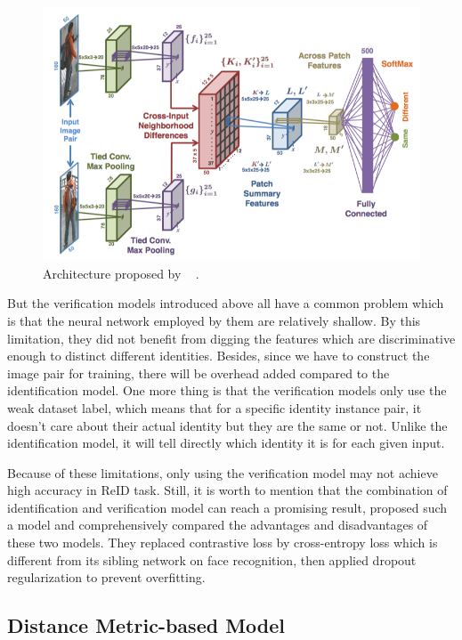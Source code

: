 \begin{figure}
    \includegraphics[width=\linewidth]{figures/cvpr15_model.png}
    \caption{Architecture proposed by ~\protect 
        \cite{an-improved-dl-archit-2015}.}
    \label{fig:cvpr15_model}
\end{figure}

But the verification models introduced above all have a common problem which is 
that the neural network employed by them are relatively
shallow. By this limitation, they did not benefit from digging the features 
which are discriminative enough to distinct different identities.
Besides, since we have to construct the image pair for training, there will be 
overhead added compared to the identification model. One more
thing is that the verification models only use the weak dataset label, which 
means that for a specific identity instance pair, it doesn't
care about their actual identity but they are the same or not. Unlike the 
identification model, it will tell directly which identity it is for each
given input.

Because of these limitations, only using the verification model may not achieve 
high accuracy in ReID task. Still, it is worth to mention
that the combination of identification and verification model can reach a 
promising result, \cite{id-verif-combined-learned-cnn-embedding-for-reid-2016} 
proposed such a model and comprehensively compared the advantages and 
disadvantages of these two models. They replaced contrastive loss by 
cross-entropy loss which is different from its sibling network on face 
recognition, then applied dropout regularization to prevent overfitting.

\subsection{Distance Metric-based Model}
\label{sec:related-work-re-id-dism}

